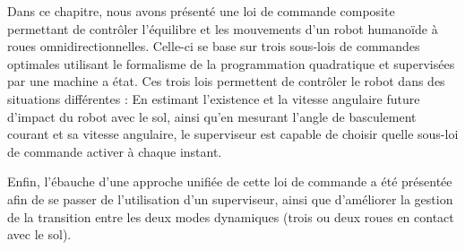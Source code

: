 		Dans ce chapitre, nous avons présenté une loi de commande composite permettant de contrôler l'équilibre et les mouvements d'un robot humanoïde à roues omnidirectionnelles.
		Celle-ci se base sur trois sous-lois de commandes optimales utilisant le formalisme de la programmation quadratique et supervisées par une machine a état.
		Ces trois lois permettent de contrôler le robot dans des situations différentes :
		En estimant l'existence et la vitesse angulaire future d'impact du robot avec le sol, ainsi qu'en mesurant l'angle de basculement courant et sa vitesse angulaire, le superviseur est capable de choisir quelle sous-loi de commande activer à chaque instant.
		
		Enfin, l'ébauche d'une approche unifiée de cette loi de commande a été présentée afin de se passer de l'utilisation d'un superviseur, ainsi que d'améliorer la gestion de la transition entre les deux modes dynamiques (trois ou deux roues en contact avec le sol).
		
		
		